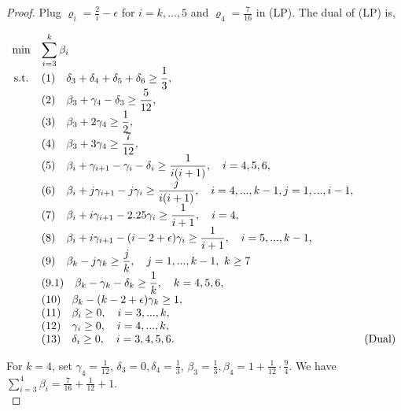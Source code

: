 \documentclass[runningheads,a4paper]{llncs}
\numberwithin{equation}{section}
\begin{document}
\begin{proof}

Plug $\varrho_i=\frac{2}{i}-\epsilon$ for $i=k,...,5$ and $\varrho_4=\frac{7}{16}$ in (LP). The dual of (LP) is,

\[\begin{array}{cll} \min &{\displaystyle \sum_{i=3}^k \beta_i} \\
{\rm s.t.} & (1) \quad {\displaystyle \delta_3+\delta_4+\delta_5+\delta_6 \geq \frac{1}{3}}, \\
& (2) \quad {\displaystyle \beta_3+\gamma_4-\delta_3 \geq \frac{5}{12}}, \\
& (3) \quad {\displaystyle \beta_3+2\gamma_4 \geq \frac{1}{2}}, \\
& (4) \quad {\displaystyle \beta_3+3\gamma_4 \geq \frac{7}{12}}, \\
& (5) \quad {\displaystyle \beta_i+\gamma_{i+1}-\gamma_i-\delta_i \geq \frac{1}{i(i+1)}}, \quad i=4,5,6, \\
& (6) \quad {\displaystyle \beta_i+j\gamma_{i+1}-j\gamma_i \geq \frac{j}{i(i+1)}}, \quad i=4,...,k-1, j=1,...,i-1, \\
& (7) \quad {\displaystyle \beta_i+i\gamma_{i+1}-2.25\gamma_i \geq \frac{1}{i+1}}, \quad i=4, \\
& (8) \quad {\displaystyle \beta_i+i\gamma_{i+1}-(i-2+\epsilon)\gamma_i \geq \frac{1}{i+1}}, \quad i=5,...,k-1, \\
& (9) \quad {\displaystyle \beta_k-j\gamma_k \geq \frac{j}{k}}, \quad j=1,...,k-1, \textrm{ }k\geq 7 \\
& (9.1) \quad {\displaystyle \beta_k-\gamma_k-\delta_k \geq \frac{1}{k}}, \quad k=4,5,6, \\
& (10) \quad {\displaystyle \beta_k-(k-2+\epsilon)\gamma_k \geq 1}, \\
& (11) \quad {\displaystyle \beta_i \geq 0}, \quad i=3,...,k, \\
& (12) \quad {\displaystyle \gamma_i \geq 0}, \quad i=4,...,k, \\
& (13) \quad {\displaystyle \delta_i \geq 0}, \quad i=3,4,5,6. & \textrm{(Dual)}
\end{array} \]





For $k=4$, set $\gamma_4=\frac{1}{12}$, $\delta_3=0,\delta_4=\frac{1}{3}$, $\beta_3=\frac{1}{3}, \beta_4=1+\frac{1}{12}\cdot\frac{9}{4}$. We have $\sum_{i=3}^4\beta_i=\frac{7}{16}+\frac{1}{12}+1$. \\


\end{proof}
\end{document}

